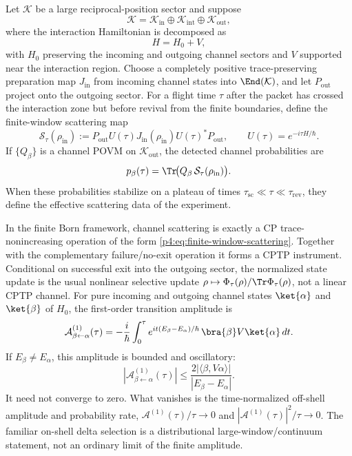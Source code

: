 \documentclass[12pt,a4paper]{article}
\begin{document}
Let $\mathcal K$ be a large reciprocal-position sector and suppose
\[
\mathcal K = \mathcal K_{\mathrm{in}} \oplus \mathcal K_{\mathrm{int}} \oplus \mathcal K_{\mathrm{out}},
\]
where the interaction Hamiltonian is decomposed as
\[
H=H_0+V,
\]
with $H_0$ preserving the incoming and outgoing channel sectors and $V$ supported near the interaction region.
Choose a completely positive trace-preserving preparation map
$J_{\mathrm{in}}$ from incoming channel states into
\(\End(\mathcal K)\), and let $P_{\mathrm{out}}$ project onto the outgoing sector.
For a flight time $\tau$ after the packet has crossed the interaction zone but before revival from the finite boundaries, define the finite-window scattering map
\begin{equation}
\label{p4:eq:finite-window-scattering}
\mathcal S_{\tau}(\rho_{\mathrm{in}})
:=
P_{\mathrm{out}}U(\tau)J_{\mathrm{in}}(\rho_{\mathrm{in}})U(\tau)^*P_{\mathrm{out}},
\qquad
U(\tau)=e^{-i\tau H/\hbar}.
\end{equation}
If $\{Q_\beta\}$ is a channel POVM on $\mathcal K_{\mathrm{out}}$, the detected channel probabilities are
\begin{equation}
\label{p4:eq:scattering-probabilities}
p_\beta(\tau)=\Tr\!\bigl(Q_\beta\,\mathcal S_{\tau}(\rho_{\mathrm{in}})\bigr).
\end{equation}
When these probabilities stabilize on a plateau of times \(\tau_{\mathrm{sc}}\ll \tau \ll \tau_{\mathrm{rev}}\), they define the effective scattering data of the experiment.

\begin{proposition}
\label{p4:prop:framework-scattering-window}
In the finite Born framework, channel scattering is exactly a CP trace-nonincreasing operation of the form \eqref{p4:eq:finite-window-scattering}. Together with the complementary failure/no-exit operation it forms a CPTP instrument. Conditional on successful exit into the outgoing sector, the normalized state update is the usual nonlinear selective update $\rho\mapsto \Phi_\tau(\rho)/\Tr\Phi_\tau(\rho)$, not a linear CPTP channel.
For pure incoming and outgoing channel states $\ket{\alpha}$ and $\ket{\beta}$ of $H_0$, the first-order transition amplitude is
\begin{equation}
\label{p4:eq:first-born-amplitude}
\mathcal A^{(1)}_{\beta\leftarrow\alpha}(\tau)
=
-\frac{i}{\hbar}\int_0^{\tau}
e^{it(E_\beta-E_\alpha)/\hbar}\,
\bra{\beta}V\ket{\alpha}\,dt.
\end{equation}
If \(E_\beta\ne E_\alpha\), this amplitude is bounded and oscillatory:
\[
\left|\mathcal A^{(1)}_{\beta\leftarrow\alpha}(\tau)\right|
\le\frac{2|\langle\beta,V\alpha\rangle|}
{|E_\beta-E_\alpha|}.
\]
It need not converge to zero.  What vanishes is the time-normalized
off-shell amplitude and probability rate,
\(\mathcal A^{(1)}(\tau)/\tau\to0\) and
\(|\mathcal A^{(1)}(\tau)|^2/\tau\to0\).  The familiar on-shell delta
selection is a distributional large-window/continuum statement, not an
ordinary limit of the finite amplitude.
\end{proposition}
\end{document}
